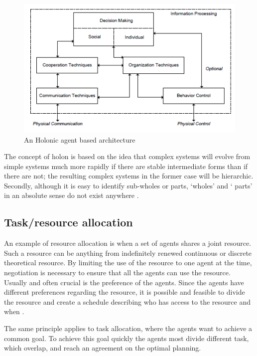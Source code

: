 \begin{figure}[h]
\centering
\includegraphics[width=0.7\linewidth]{img/holonic_agent_based_system}
\caption{An Holonic agent based architecture \citet{giret2005multi}}
\label{fig:holonicagentbasedsystem}
\end{figure}

The concept of holon is based on the idea that complex systems will evolve from simple systems much more rapidly if there are stable intermediate forms than if there are not; the resulting complex systems in the former case will be hierarchic. Secondly, although it is easy to identify sub-wholes or parts, ‘wholes’ and ‘ parts’ in an absolute sense do not exist anywhere \citep{van1998reference}.

\subsection{Task/resource allocation}
An example of resource allocation is when a set of agents shares a joint resource. Such a resource can be anything from indefinitely renewed continuous or discrete theoretical resource. By limiting the use of the resource to one agent at the time, negotiation is necessary to ensure that all the agents can use the resource. Usually and often crucial is the preference of the agents. Since the agents have different preferences regarding the resource, it is possible and feasible to divide the resource and create a schedule describing who has access to the resource and when \citep{fatima2014principles}. 

The same principle applies to task allocation, where the agents want to achieve a common goal. To achieve this goal quickly the agents most divide different task, which overlap, and reach an agreement on the optimal planning. 


